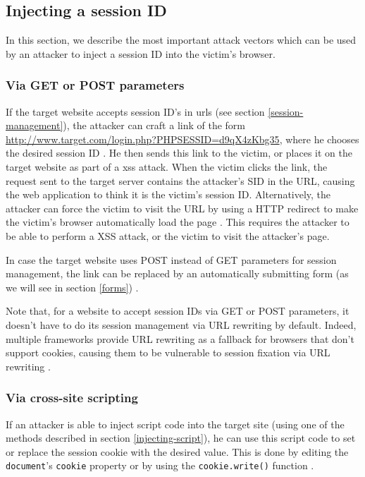 \subsection{Injecting a session ID}\label{injecting-sid}

In this section, we describe the most important attack vectors which can be used by an attacker to inject a session ID into the victim's browser.

\subsubsection{Via GET or POST parameters}\label{get-or-post}

If the target website accepts session ID's in \glspl{url} (see section \ref{session-management}), the attacker can craft a link of the form \url{http://www.target.com/login.php?PHPSESSID=d9qX4zKbg35}, where he chooses the desired session ID \cite{Johns2011}. He then sends this link to the victim, or places it on the target website as part of a \gls{xss} attack. When the victim clicks the link, the request sent to the target server contains the attacker's SID in the URL, causing the web application to think it is the victim's session ID. Alternatively, the attacker can force the victim to visit the URL by using a HTTP redirect \cite{rfc2616} to make the victim's browser automatically load the page \cite{Shiflett2004}. This requires the attacker to be able to perform a XSS attack, or the victim to visit the attacker's page.

In case the target website uses POST instead of GET parameters for session management, the link can be replaced by an automatically submitting form (as we will see in section \ref{forms}) \cite{Kolsek2002,Bontrager2005}.

Note that, for a website to accept session IDs via GET or POST parameters, it doesn't have to do its session management via URL rewriting by default. Indeed, multiple frameworks provide URL rewriting as a fallback for browsers that don't support cookies, causing them to be vulnerable to session fixation via URL rewriting \cite{PHPURLrewriting,Condit2006,Holovaty2008}.

\subsubsection{Via cross-site scripting}

If an attacker is able to inject script code into the target site (using one of the methods described in section \ref{injecting-script}), he can use this script code to set or replace the \gls{session cookie} with the desired value. This is done by editing the \texttt{document}'s \texttt{cookie} property \cite{Kolsek2002} or by using the \texttt{cookie.write()} function \cite{Johns2011}.

